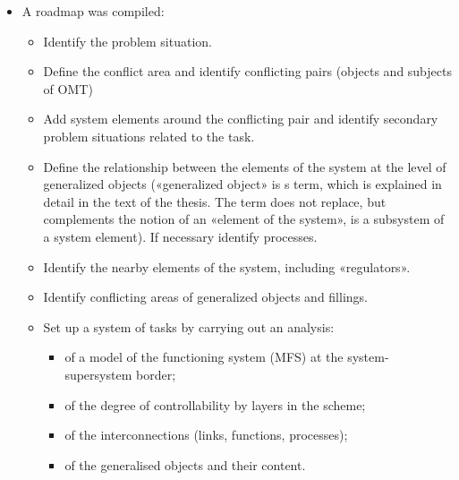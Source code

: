 \documentclass[11pt,a4paper]{book}
\begin{document}
\begin{itemize}
\item A roadmap was compiled:
  \begin{itemize}
  \item Identify the problem situation.
  \item Define the conflict area and identify conflicting pairs (objects and
    subjects of OMT)
  \item Add system elements around the conflicting pair and identify secondary
    problem situations related to the task.
  \item Define the relationship between the elements of the system at the
    level of generalized objects («generalized object» is s term, which is
    explained in detail in the text of the thesis. The term does not replace,
    but complements the notion of an «element of the system», is a subsystem
    of a system element). If necessary identify processes.
  \item Identify the nearby elements of the system, including «regulators».
  \item Identify conflicting areas of generalized objects and fillings.
  \item Set up a system of tasks by carrying out an analysis:
    \begin{itemize}
      \item of a model of the functioning system (MFS) at the
        system-supersystem border;
      \item of the degree of controllability by layers in the scheme;
      \item of the interconnections (links, functions, processes);
      \item of the generalised objects and their content.
    \end{itemize}
  \end{itemize}


\end{itemize}
\end{document}
